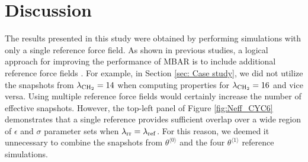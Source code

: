 \documentclass[journal=jced,manuscript=article]{achemso}
\begin{document}

\section{Discussion} \label{sec: Discussion}

The results presented in this study were obtained by performing simulations with only a single reference force field. As shown in previous studies, a logical approach for improving the performance of MBAR is to include additional reference force fields \cite{Postdoc_1,Postdoc_2}. For example, in Section \ref{sec: Case study}, we did not utilize the snapshots from $\lambda_{\rm CH_2} = 14$ when computing properties for $\lambda_{\rm CH_2} = 16$ and vice versa. Using multiple reference force fields would certainly increase the number of effective snapshots. However, the top-left panel of Figure \ref{fig:Neff_CYC6} demonstrates that a single reference provides sufficient overlap over a wide region of $\epsilon$ and $\sigma$ parameter sets when $\lambda_{\rm rr} = \lambda_{\rm ref}$. For this reason, we deemed it unnecessary to combine the snapshots from $\theta^{\langle0\rangle}$ and the four $\theta^{\langle1\rangle}$ reference simulations.
\end{document}
